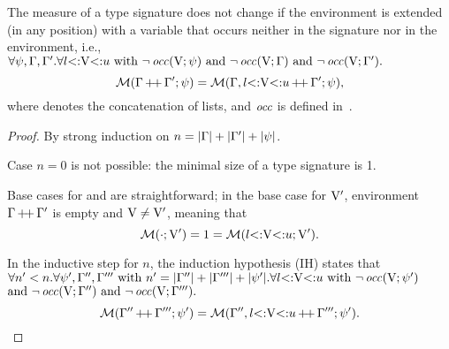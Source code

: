 \begin{lemma}%
\label{lem:msr-weakening:app}
    The measure of a type signature does not change if the environment
    is extended (in any position) with a variable that occurs neither
    in the signature nor in the environment, i.e.,
    $\forall \psi, \Gamma, \Gamma'. 
    \forall l{\operatorname{<:}}\mathrm{V}{\operatorname{<:}}u \text{ with } 
    \lnot \operatorname{\mathit{occ}}(\mathrm{V};\psi) \text{ and } 
    \lnot \operatorname{\mathit{occ}}(\mathrm{V};\Gamma) \text{ and } \lnot \operatorname{\mathit{occ}}(\mathrm{V};\Gamma').$
    \[\operatorname{\mathcal{M}}(\Gamma\operatorname{+\!+}\Gamma';\psi) = 
        \operatorname{\mathcal{M}}(\Gamma,l{\operatorname{<:}}\mathrm{V}{\operatorname{<:}}u\operatorname{+\!+}\Gamma';\psi),\]
    where  denotes the concatenation of lists,
    and $\operatorname{\mathit{occ}}$ is defined in~.
\end{lemma}
\begin{proof}
    By strong induction on $n = |\Gamma| + |\Gamma'| + |\psi|$.

    Case $n = 0$ is not possible: the minimal size of a type signature is 1.

    Base cases for \tyany and \tybot are straightforward; in the base case
    for $\mathrm{V}'$, environment $\Gamma\operatorname{+\!+}\Gamma'$ is empty and
    $\mathrm{V} \neq \mathrm{V}'$, 
    meaning that \[\operatorname{\mathcal{M}}(\cdot;\mathrm{V}') = 1 = 
    \operatorname{\mathcal{M}}(l{\operatorname{<:}}\mathrm{V}{\operatorname{<:}}u;\mathrm{V}').\]
    
    In the inductive step for $n$, the induction hypothesis (IH) states that
    $\forall n'<n. \forall \psi', \Gamma'', \Gamma'''  \text{ with }
    n' = |\Gamma''| + |\Gamma'''| + |\psi'|.
    \forall l{\operatorname{<:}}\mathrm{V}{\operatorname{<:}}u \text{ with } 
    \lnot \operatorname{\mathit{occ}}(\mathrm{V};\psi')$\\$\text{and } 
    \lnot \operatorname{\mathit{occ}}(\mathrm{V};\Gamma'') \text{ and } \lnot \operatorname{\mathit{occ}}(\mathrm{V};\Gamma''').$
    \[\operatorname{\mathcal{M}}(\Gamma''\operatorname{+\!+}\Gamma''';\psi') = 
    \operatorname{\mathcal{M}}(\Gamma'',l{\operatorname{<:}}\mathrm{V}{\operatorname{<:}}u\operatorname{+\!+}\Gamma''';\psi').\]
    

\end{proof}
